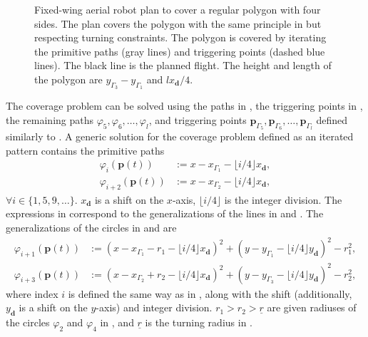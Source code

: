 \begin{figure}[ht!]
  \centering
  
  \caption[Zamboni-like motion to cover a regular polygon with four sides]{Fixed-wing aerial robot plan to cover a regular polygon with four sides. The plan covers the polygon with the same principle in  but respecting turning constraints. The polygon is covered by iterating the primitive paths (gray lines) and triggering points (dashed blue lines). The black line is the planned flight. The height and length of the polygon are $y_{\Gamma_3}-y_{\Gamma_1}$ and $lx_\mathbf{d}/4$.}
  \label{fig:zambo-like_pb}
\end{figure}

The coverage problem can be solved using the paths in , the triggering points in , the remaining paths $\varphi_5,\varphi_6,\dots,\varphi_l$, and triggering points $\mathbf{p}_{\Gamma_5},\mathbf{p}_{\Gamma_6},\dots,\mathbf{p}_{\Gamma_l}$ defined similarly to . A generic solution for the coverage problem defined as an iterated pattern contains the primitive paths
\begin{subequations}\label{eq:line-gene}\begin{align}
  \varphi_i(\mathbf{p}(t))&:=x-x_{\Gamma_1}-\lfloor i/4\rfloor x_\mathbf{d},\\
  \varphi_{i+2}(\mathbf{p}(t))&:=x-x_{\Gamma_2}-\lfloor i/4\rfloor x_\mathbf{d},
\end{align}
\end{subequations}
$\forall i\in\{1,5,9,\dots\}$. $x_\mathbf{d}$ is a shift on the $x$-axis, $\lfloor i/4\rfloor$ is the integer division. The expressions in  correspond to the generalizations of the lines in  and . The generalizations of the circles in  and  are
\begin{subequations}\label{eq:circ-gene}\begin{align}
  \varphi_{i+1}(\mathbf{p}(t))&:=(x-x_{\Gamma_1}-r_1-\lfloor i/4\rfloor x_\mathbf{d})^2+(y-y_{\Gamma_1}-\lfloor i/4\rfloor y_\mathbf{d})^2-r_1^2,\\
  \varphi_{i+3}(\mathbf{p}(t))&:=(x-x_{\Gamma_2}+r_2-\lfloor i/4\rfloor x_\mathbf{d})^2+(y-y_{\Gamma_3}-\lfloor i/4\rfloor y_\mathbf{d})^2-r_2^2,\label{eq:second-circ-gene}
\end{align}
\end{subequations}
where index $i$ is defined the same way as in , along with the shift (additionally, $y_\mathbf{d}$ is a shift on the $y$-axis) and integer division. $r_1>r_2>\underline{r}$ are given radiuses of the circles $\varphi_2$ and $\varphi_4$ in , and $\underline{r}$ is the turning radius in .

